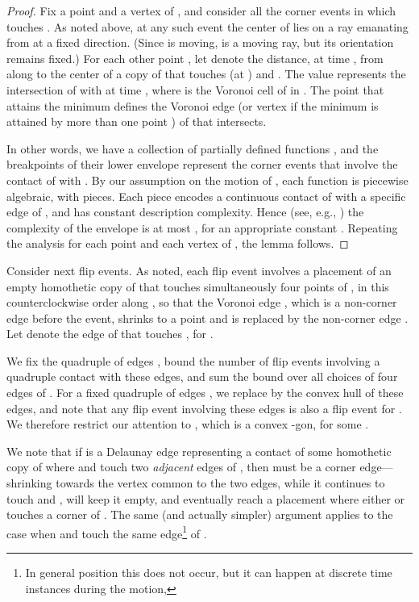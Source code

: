 \documentclass[letter,11pt]{article}
\begin{document}
\begin{proof}
Fix a point  and a vertex  of , and consider all the corner
events in which  touches . As noted above, at any such event the
center  of  lies on a ray  emanating from  at a fixed
direction. (Since  is moving,  is a moving ray, but its orientation remains fixed.) For each other point , let 
denote the distance, at time , from  along  to the center
of a copy of  that touches  (at ) and .
The value
 represents the intersection of
 with  at time , where  is the Voronoi cell of  in . The point  that attains the
minimum defines the Voronoi edge  (or vertex if the 
minimum is attained by more than one point ) of  that  intersects.

In other words, we have a collection of  partially defined
functions , and the breakpoints of their lower envelope
represent the corner events that involve the contact
of  with . By our assumption on the motion of , each 
function  is piecewise algebraic, 
with  pieces. Each piece encodes a continuous contact of  
with a specific edge of , and has constant description complexity. Hence (see, e.g., \cite[Corollary 1.6]{SA95}) the complexity of
the envelope is at most , for an appropriate constant
. Repeating the analysis for each point  and each vertex  of , the lemma
follows.
\end{proof}

Consider next flip events. As noted, each flip event involves a 
placement of an empty homothetic copy  of  that touches 
simultaneously four points  of , in this 
counterclockwise order along , so that the 
Voronoi edge ,
which is a non-corner edge before the event, shrinks to a point
and is replaced by the non-corner edge . Let 
denote the edge of  that touches , for . 

We fix the quadruple of edges , bound the number
of flip events involving a quadruple contact with these edges,
and sum the bound over all  choices of four edges of .
For a fixed quadruple of edges , we replace  by
the convex hull  of these edges, and note that any flip event
involving these edges is also a flip event
for . We therefore restrict our attention to , which is
a convex -gon, for some .

We note that if  is a Delaunay edge
representing a contact of some homothetic copy  of  where  and 
touch two {\em adjacent} edges of , then  must be a corner
edge---shrinking  towards the vertex common to the two edges,
while it continues to touch  and , will keep it empty, and
eventually reach a placement where either  or  touches a corner
of .
The same (and actually simpler) argument applies to the case when  and  touch the same edge\footnote{In general position this does not occur, but it can happen at discrete time instances during the motion,} of .
\end{document}

